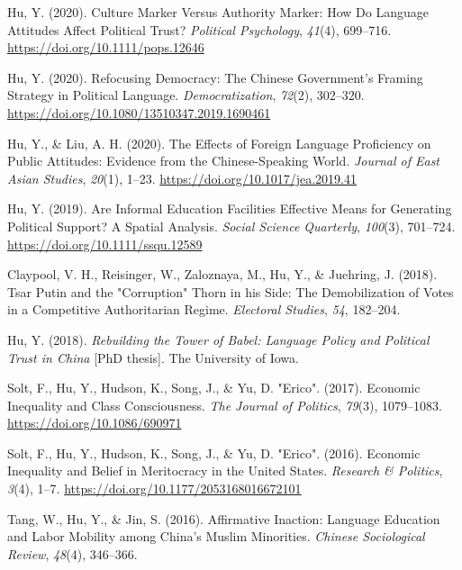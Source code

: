 \documentclass[11pt, a4paper]{awesome-cv}
\begin{document}
\leavevmode\hypertarget{ref-Hu2020}{}%
Hu, Y. (2020). Culture {Marker Versus Authority Marker}: {How Do
Language Attitudes Affect Political Trust}? \emph{Political Psychology},
\emph{41}(4), 699--716. \url{https://doi.org/10.1111/pops.12646}

\leavevmode\hypertarget{ref-Hu2020a}{}%
Hu, Y. (2020). Refocusing {Democracy}: {The Chinese Government}'s
{Framing Strategy} in {Political Language}. \emph{Democratization},
\emph{72}(2), 302--320.
\url{https://doi.org/10.1080/13510347.2019.1690461}

\leavevmode\hypertarget{ref-HuLiu2020}{}%
Hu, Y., \& Liu, A. H. (2020). The {Effects} of {Foreign Language
Proficiency} on {Public Attitudes}: {Evidence} from the
{Chinese}-{Speaking World}. \emph{Journal of East Asian Studies},
\emph{20}(1), 1--23. \url{https://doi.org/10.1017/jea.2019.41}

\leavevmode\hypertarget{ref-Hu2019}{}%
Hu, Y. (2019). Are {Informal Education Facilities Effective Means} for
{Generating Political Support}? {A Spatial Analysis}. \emph{Social
Science Quarterly}, \emph{100}(3), 701--724.
\url{https://doi.org/10.1111/ssqu.12589}

\leavevmode\hypertarget{ref-ClaypoolEtAl2018}{}%
Claypool, V. H., Reisinger, W., Zaloznaya, M., Hu, Y., \& Juehring, J.
(2018). Tsar {Putin} and the "{Corruption}" {Thorn} in his {Side}: {The
Demobilization} of {Votes} in a {Competitive Authoritarian Regime}.
\emph{Electoral Studies}, \emph{54}, 182--204.

\leavevmode\hypertarget{ref-Hu2018b}{}%
Hu, Y. (2018). \emph{Rebuilding the {Tower} of {Babel}: {Language
Policy} and {Political Trust} in {China}} {[}PhD thesis{]}. The
University of Iowa.

\leavevmode\hypertarget{ref-SoltEtAl2017}{}%
Solt, F., Hu, Y., Hudson, K., Song, J., \& Yu, D. "Erico". (2017).
Economic {Inequality} and {Class Consciousness}. \emph{The Journal of
Politics}, \emph{79}(3), 1079--1083.
\url{https://doi.org/10.1086/690971}

\leavevmode\hypertarget{ref-SoltEtAl2016}{}%
Solt, F., Hu, Y., Hudson, K., Song, J., \& Yu, D. "Erico". (2016).
Economic {Inequality} and {Belief} in {Meritocracy} in the {United
States}. \emph{Research \& Politics}, \emph{3}(4), 1--7.
\url{https://doi.org/10.1177/2053168016672101}

\leavevmode\hypertarget{ref-TangEtAl2016a}{}%
Tang, W., Hu, Y., \& Jin, S. (2016). Affirmative {Inaction}: {Language
Education} and {Labor Mobility} among {China}'s {Muslim Minorities}.
\emph{Chinese Sociological Review}, \emph{48}(4), 346--366.
\end{document}

